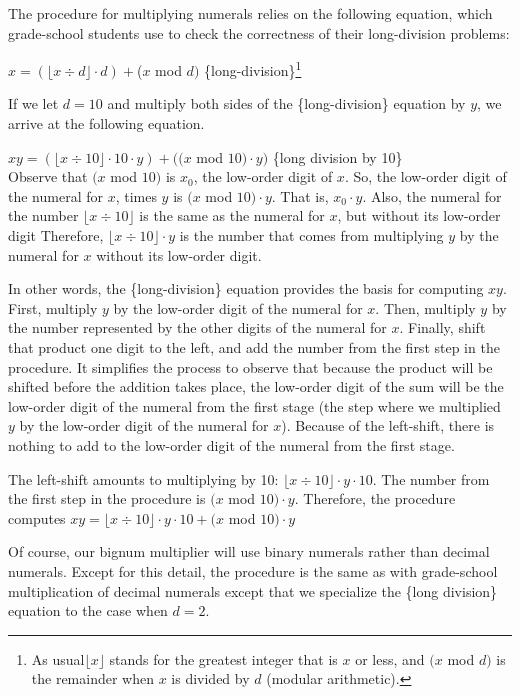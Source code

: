 The procedure for multiplying numerals relies on the following equation,
which grade-school students use to check the correctness of their long-division problems:

\hspace{2mm} $x = (\lfloor x \div d \rfloor \cdot d) + $($x$ mod $d)$ \hfill \{long-division\}\footnote{As
usual$\lfloor x\rfloor$ stands for the greatest integer that is $x$ or less,
and $(x$ mod $d)$ is the remainder when $x$ is divided by $d$ (modular arithmetic).}

If we let $d = 10$ and multiply both sides of the \{long-division\} equation by $y$,
we arrive at the following equation.

\hspace{2cm} $xy = (\lfloor x \div 10 \rfloor \cdot 10 \cdot y) + ((x$ mod $10) \cdot y)$
\hfill \{long division by 10\} \\

Observe that $(x$ mod $10)$ is $x_0$, the low-order digit of $x$.
So, the low-order digit of the numeral for $x$, times $y$ is 
$(x$ mod $10) \cdot y$. That is, $x_0 \cdot y$.
Also, the numeral for the number
$\lfloor x \div 10 \rfloor$ is the same as the numeral for $x$, but
without its low-order digit
Therefore, $\lfloor x \div 10 \rfloor \cdot y$ is the number that
comes from multiplying $y$ by the numeral for $x$ without its low-order digit.

In other words, the \{long-division\} equation
provides the basis for computing $xy$.
First, multiply $y$ by the low-order
digit of the numeral for $x$.
Then, multiply $y$ by the number
represented by the other digits of the numeral for $x$.
Finally, shift that product one digit to the left,
and add the number from the first step in the procedure.
It simplifies the process to observe that
because the product will be shifted before the addition takes place,
the low-order digit of the sum will be the low-order digit of
the numeral from the first stage
(the step where we multiplied $y$ by the low-order digit of the numeral for $x$).
Because of the left-shift, there is nothing to add to the low-order digit of
the numeral from the first stage.

The left-shift amounts to multiplying by 10: $\lfloor x \div 10 \rfloor \cdot y \cdot 10$.
The number from the first step in the procedure is $(x$ mod $10) \cdot y$.
Therefore, the procedure computes
$xy = \lfloor x \div 10 \rfloor \cdot y \cdot 10 + (x$ mod $10) \cdot y$

Of course, our bignum multiplier
will use binary numerals rather than decimal numerals.
Except for this detail, the procedure is the same
as with grade-school multiplication of decimal numerals
except that we specialize the \{long division\} equation to the case when $d = 2$.

